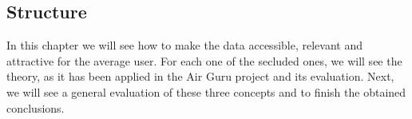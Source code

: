 \subsection*{Structure}

In this chapter we will see how to make the data accessible, relevant and attractive for 
the average user. For each one of the secluded ones, we will see the theory, as it has been applied
in the Air Guru project and its evaluation.
Next, we will see a general evaluation of these three concepts and to finish the 
obtained conclusions.
